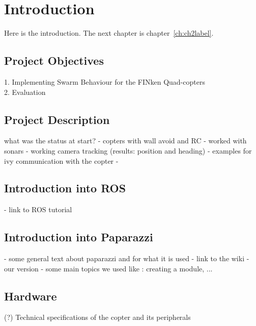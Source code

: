 \chapter{Introduction}\label{ch:introduction}
Here is the introduction. The next chapter is chapter~\ref{ch:ch2label}.

\section{Project Objectives}
1. Implementing Swarm Behaviour for the FINken Quad-copters \\
2. Evaluation

\section{Project Description}
what was the status at start?
 - copters with wall avoid and RC
     - worked with sonars
 - working camera tracking (results: position and heading)
 - examples for ivy communication with the copter
 - 

\section{Introduction into ROS}
- link to ROS tutorial

\section{Introduction into Paparazzi}
- some general text about paparazzi and for what it is used
- link to the wiki
- our version
- some main topics we used like : creating a module, ...

\section{Hardware}
(?) Technical specifications of the copter and its peripherals

